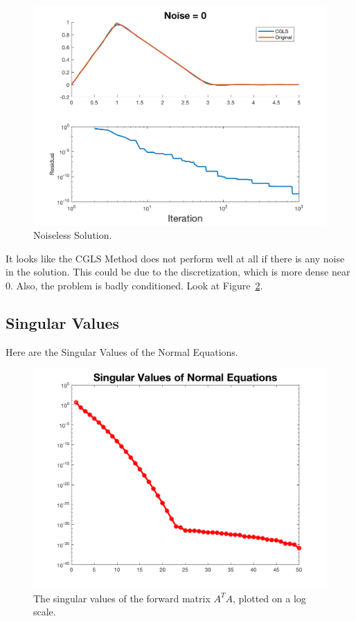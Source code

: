 \documentclass{article}
\begin{document}
\begin{figure}[H]
    \centerline{
    \includegraphics[height = 10 cm]{Laplace_0.png}
    }
    \caption{\label{fig:Laplace_0} Noiseless Solution.}
\end{figure}

It looks like the CGLS Method does not perform well at all if there is any noise in the solution. This could be due to the discretization, which is more dense near 0. Also, the problem is badly conditioned. Look at Figure~\ref{fig:Singular Values}.

\subsection{Singular Values}
Here are the Singular Values of the Normal Equations.

\begin{figure}[H]
    \centerline{
    \includegraphics[height = 10 cm]{SingVals.png}
    }
    \caption{\label{fig:Singular Values} The singular values of the forward matrix $A^{T}A$, plotted on a log scale.}
\end{figure}
\end{document}
